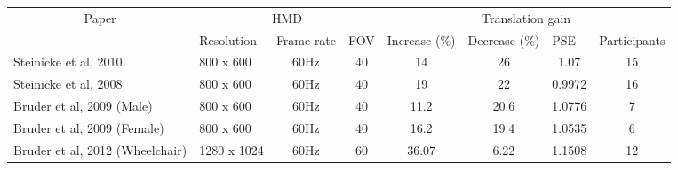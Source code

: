 
\begin{table}[]
\centering
\begin{tabular}{|l|lcc|cccc|}
\hline
\multicolumn{1}{|c|}{\multirow{2}{*}{Paper}} & \multicolumn{3}{c|}{HMD}   & \multicolumn{4}{c|}{Translation gain}   \\ \cline{2-8} 

\multicolumn{1}{|c|}{}                       & Resolution                 & \multicolumn{1}{l}{Frame rate}                      & \multicolumn{1}{l|}{FOV}                           & \multicolumn{1}{l}{Increase (\%)} & \multicolumn{1}{l}{Decrease (\%)} & \multicolumn{1}{l}{PSE} & \multicolumn{1}{l|}{Participants} \\ \hline
Steinicke et al, 2010\cite{steinicke2010estimation}                              & 800 x 600                                                                           & 60Hz                                                & 40                                                 & 14                                & 26                                & 1.07                    & 15                                \\ \hline
Steinicke et al, 2008\cite{steinicke2008analyses}                              & 800 x 600                                                                           & 60Hz                                                & 40                                                 & 19                                & 22                                & 0.9972                  & 16                                \\ \hline
Bruder et al, 2009\cite{bruder2009impact} (Male)                          & 800 x 600                                                                           & 60Hz                                                & 40                                                 & 11.2                              & 20.6                              & 1.0776                  & 7                                 \\ \hline
Bruder et al, 2009\cite{bruder2009impact} (Female)                        & 800 x 600                                                                           & 60Hz                                                & 40                                                 & 16.2                              & 19.4                              & 1.0535                  & 6                                 \\ \hline
Bruder et al, 2012\cite{bruder2012redirecting} (Wheelchair)                    & \multicolumn{1}{c}{1280 x 1024}                                                     & 60Hz                                                & 60                                                 & 36.07                             & 6.22                              & 1.1508                  & 12                                \\ \hline

\end{tabular}
\end{table}
